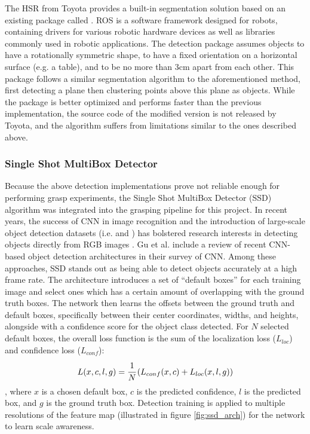 The HSR from Toyota provides a built-in segmentation solution based on an existing
 package called \linebreak
{}. ROS is a software
framework designed for robots, containing drivers for various robotic hardware devices as well as libraries commonly
used in robotic applications. The detection package assumes objects to have a rotationally symmetric shape, to have a
fixed orientation on a horizontal surface (e.g. a table), and to be no more than 3cm apart from each other. This package
follows a similar segmentation algorithm to the aforementioned method, first detecting a plane then clustering points
above this plane as objects. While the package is better optimized and performs faster than the previous implementation,
the source code of the modified version is not released by Toyota, and the algorithm suffers from limitations similar to
the ones described above.

\subsubsection*{Single Shot MultiBox Detector}


Because the above detection implementations prove not reliable enough for performing grasp experiments, the Single Shot
MultiBox Detector (SSD) algorithm \cite{Liu2016SSD} was integrated into the grasping pipeline for this project. In
recent years, the success of CNN in image recognition and the introduction of large-scale object detection datasets
(i.e.  and
) has bolstered research interests in
detecting objects directly from RGB images \cite{Gu2018}. Gu et al. \cite{Gu2018} include a review of recent CNN-based
object detection architectures in their survey of CNN. Among these approaches, SSD stands out as being able to detect
objects accurately at a high frame rate. The architecture introduces a set of ``default boxes'' for each training image
and select ones which has a certain amount of overlapping with the ground truth boxes. The network then learns the
offsets between the ground truth and default boxes, specifically between their center coordinates, widths, and heights,
alongside with a confidence score for the object class detected. For $ N $ selected default boxes, the overall loss
function is the sum of the localization loss ($ L_{loc} $) and confidence loss ($ L_{conf} $):
\[ L(x,c,l,g) = \cfrac{1}{N} \left( L_{conf}(x, c) + L_{loc}(x,l,g) \right) \],
where $ x $ is a chosen default box, $ c $ is the predicted confidence, $ l $ is the predicted box, and $ g $ is the
ground truth box. Detection training is applied to multiple resolutions of the feature map (illustrated in figure
\ref{fig:ssd_arch}) for the network to learn scale awareness.

